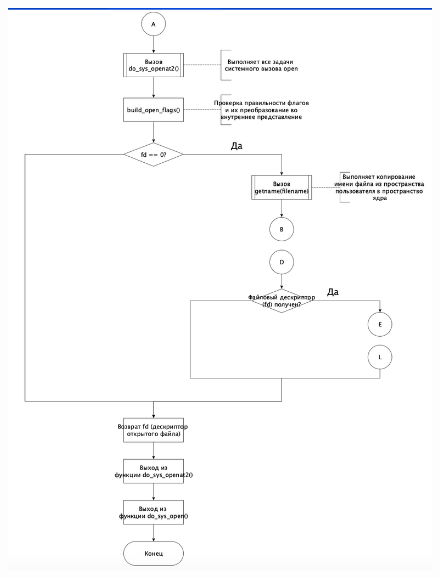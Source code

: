 \documentclass[a4paper,12pt]{article}
\begin{document}
	\begin{figure}[h!]
		\begin{center}
			{\includegraphics[scale = 0.8]{1.png}}
			\label{1}
		\end{center}
	\end{figure}
\end{document}
